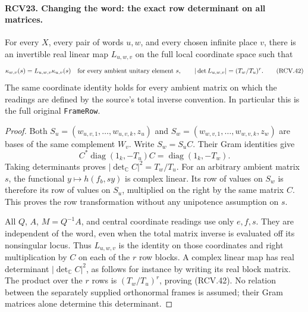 \paragraph{RCV23. Changing the word: the exact row determinant on all matrices.}
\label{claim:RCV23}
For every \(X\), every pair of words \(u,w\), and every
chosen infinite place \(v\), there is an invertible real linear
map \(L_{u,w,v}\) on the full local coordinate space such that
\[
 \kappa_{w,v}(s)=L_{u,w,v}\kappa_{u,v}(s)
       \quad\hbox{for every ambient unitary element }s,
 \qquad |\det L_{u,w,v}|=(T_w/T_u)^r.
\tag{RCV.42}
\]
The same coordinate identity holds for every ambient matrix on which
the readings are defined by the source's total inverse convention.
In particular this is the full original \texttt{FrameRow}.
\begin{proof}
Both \(S_u=(w_{u,v,1},\ldots,w_{u,v,k},z_u)\) and
\(S_w=(w_{w,v,1},\ldots,w_{w,v,k},z_w)\) are bases of the
same complement \(W_v\).  Write \(S_w=S_u C\).  Their Gram
identities give
\[
       C^*\operatorname{diag}(1_k,-T_u)C
                           =\operatorname{diag}(1_k,-T_w).
\]
Taking determinants proves \(|\det_{\mathbb C}C|^2=T_w/T_u\).
For an arbitrary ambient matrix \(s\), the functional
\(y\mapsto h(f_b,sy)\) is complex linear.  Its row of values
on \(S_w\) is therefore its row of values on \(S_u\), multiplied
on the right by the same matrix \(C\).  This proves the row
transformation without any unipotence assumption on \(s\).

All \(Q\), \(A\), \(M=Q^{-1}A\), and central coordinate
readings use only \(e,f,s\).  They are independent of the word,
even when the total matrix inverse is evaluated off its nonsingular
locus.  Thus \(L_{u,w,v}\) is the identity on those coordinates
and right multiplication by \(C\) on each of the \(r\) row
blocks.  A complex linear map has real determinant
\(|\det_{\mathbb C}C|^2\), as follows for instance by writing
its real block matrix.  The product over the \(r\) rows is
\((T_w/T_u)^r\), proving (RCV.42).
No relation between the separately supplied orthonormal frames is
assumed; their Gram matrices alone determine this determinant.
\end{proof}

